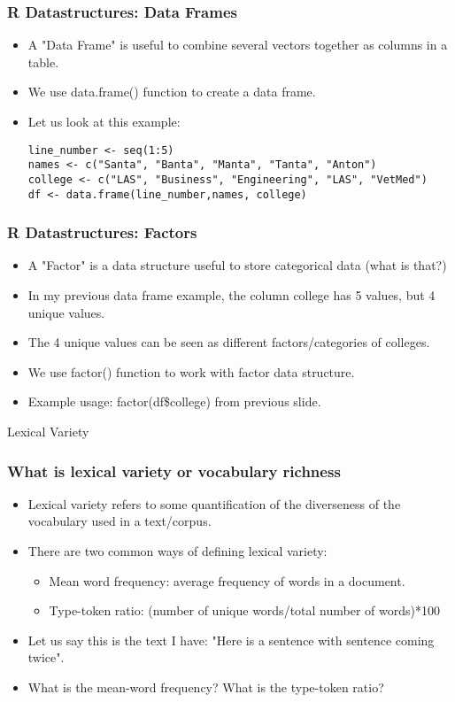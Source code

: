 \documentclass{beamer}
\begin{document}
\begin{frame}[fragile]
\frametitle{R Datastructures: Data Frames}
\begin{itemize}
\item A "Data Frame" is useful to combine several vectors together as columns in a table. 
\item We use data.frame() function to create a data frame. \pause
\item Let us look at this example:
\footnotesize
\begin{verbatim}
line_number <- seq(1:5)
names <- c("Santa", "Banta", "Manta", "Tanta", "Anton")
college <- c("LAS", "Business", "Engineering", "LAS", "VetMed")
df <- data.frame(line_number,names, college)
\end{verbatim}
\end{itemize}
\end{frame}


\begin{frame}
\frametitle{R Datastructures: Factors}
\begin{itemize}
\item A "Factor" is a data structure useful to store categorical data (what is that?) \pause
\item In my previous data frame example, the column college has 5 values, but 4 unique values. 
\item The 4 unique values can be seen as different factors/categories of colleges. 
\item We use factor() function to work with factor data structure.
\item Example usage: factor(df\$college) from previous slide.
\end{itemize}
\end{frame}

\begin{frame}
\Large Lexical Variety
\end{frame}

\begin{frame}
\frametitle{What is lexical variety or vocabulary richness}
\begin{itemize}
\item Lexical variety refers to some quantification of the diverseness of the vocabulary used in a text/corpus.
\item There are two common ways of defining lexical variety:
\begin{itemize}
\item Mean word frequency: average frequency of words in a document.
\item Type-token ratio: (number of unique words/total number of words)*100
\end{itemize} \pause
\item Let us say this is the text I have: "Here is a sentence with sentence coming twice".
\item What is the mean-word frequency? What is the type-token ratio? \pause
\end{itemize}
\end{frame}
\end{document}
